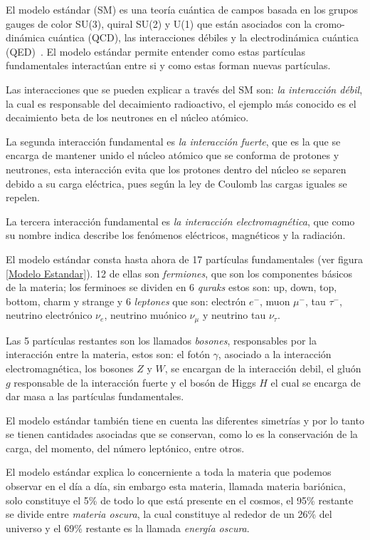 \documentclass[journal]{IEEEtran}
\begin{document}
El modelo estándar (SM) es una teoría cuántica de campos basada en los grupos gauges de color SU(3), quiral SU(2) y U(1) que están asociados con la cromo-dinámica cuántica (QCD), las interacciones débiles y la electrodinámica cuántica (QED)~\cite{S.D. Bass}. El modelo estándar permite entender como estas partículas fundamentales interactúan entre si y como estas forman nuevas partículas.

Las interacciones que se pueden explicar a través del SM son: \emph{la interacción débil}, la cual es responsable del decaimiento radioactivo, el ejemplo más conocido es el decaimiento beta de los neutrones en el núcleo atómico.

La segunda interacción fundamental es \emph{la interacción fuerte}, que es la que se encarga de mantener unido el núcleo atómico que se conforma de protones y neutrones, esta interacción evita que los protones dentro del núcleo se separen debido a su carga eléctrica, pues según la ley de Coulomb las cargas iguales se repelen.

La tercera interacción fundamental es \emph{la interacción electromagnética}, que como su nombre indica describe los fenómenos eléctricos, magnéticos y la radiación.  

El modelo estándar consta hasta ahora de 17 partículas fundamentales (ver figura \ref{Modelo Estandar}). 12 de ellas son \emph{fermiones}, que son los componentes básicos de la materia; los ferminoes se dividen en 6 \emph{quraks} estos son: up, down, top, bottom, charm y strange y  6 \emph{leptones} que son: electrón $e^{-}$, muon $\mu^{-}$, tau $\tau^{-}$, neutrino electrónico $\nu_{e}$, neutrino muónico $\nu_{\mu}$ y neutrino tau $\nu_{\tau}$.

Las 5 partículas restantes son los llamados \emph{bosones}, responsables por la interacción entre la  materia, estos son: el fotón $\gamma$, asociado a la interacción electromagnética, los bosones $Z$ y $W$, se encargan de la interacción debil, el gluón $g$ responsable de la interacción fuerte y el bosón de Higgs $H$ el cual se encarga de dar masa a las partículas fundamentales.

El modelo estándar también tiene en cuenta las diferentes simetrías y por lo tanto se tienen cantidades asociadas que se conservan, como lo es la conservación de la carga, del momento, del número leptónico, entre otros.

El modelo estándar explica lo concerniente a toda la materia que podemos observar en el día a día, sin embargo esta materia, llamada materia bariónica, solo constituye el 5\% de todo lo que está presente en el cosmos, el 95\% restante se divide entre \emph{materia oscura}, la cual constituye al rededor de un 26\% del universo y el 69\% restante es la llamada \emph{energía oscura}.
\end{document}

